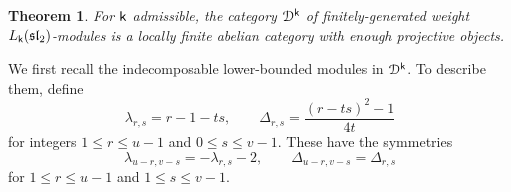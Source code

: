 \documentclass[a4paper, reqno]{amsart}
\newtheorem{theorem}{Theorem}[section]
\theoremstyle{introTheorems}
\newcommand\cD{\mathcal{D}}
\renewcommand\sl{\mathfrak{sl}}
\renewcommand{\1}{\mathbbold{1}}
\begin{document}
\begin{theorem}\textup{\cite{ACK}}
    For  $\mathsf{k}$ admissible, the category $\cD^\k$ of finitely-generated weight $L_\k(\sl_2)$-modules is a locally finite abelian category with enough projective objects.
\end{theorem}
We first recall the indecomposable lower-bounded modules in $\cD^\k$. To describe them, define
\begin{equation}
\lambda_{r,s} = r-1-ts,\qquad\Delta_{r,s}=\frac{(r-ts)^2-1}{4t}
\end{equation}
for integers $1\leq r\leq u-1$ and $0\leq s\leq v-1$. These have the symmetries
\begin{equation}\label{eqn:lambda-Delta-symmetries}
    \lambda_{u-r,v-s} = -\lambda_{r,s}-2,\qquad\Delta_{u-r,v-s}=\Delta_{r,s}
\end{equation}
for $1\leq r\leq u-1$ and $1\leq s\leq v-1$.
\end{document}
